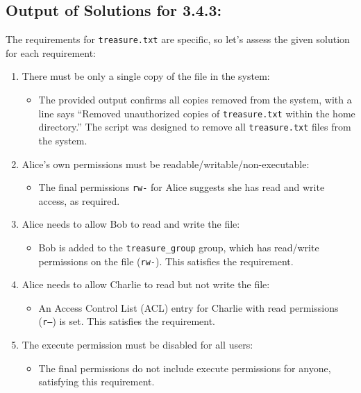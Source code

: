 \documentclass{article}
\begin{document}
\subsection*{Output of Solutions for 3.4.3:}


The requirements for \texttt{treasure.txt} are specific, so let's assess the given solution for each requirement:

\begin{enumerate}
    \item There must be only a single copy of the file in the system:
    \begin{itemize}
        \item The provided output confirms all copies removed from the system, with a line says ``Removed unauthorized copies of \texttt{treasure.txt} within the home directory.'' The script was designed to remove all \texttt{treasure.txt} files from the system. 
    \end{itemize}
    
    \item Alice's own permissions must be readable/writable/non-executable:
    \begin{itemize}
        \item The final permissions \texttt{rw-} for Alice suggests she has read and write access, as required.
    \end{itemize}
    
    \item Alice needs to allow Bob to read and write the file:
    \begin{itemize}
        \item Bob is added to the \texttt{treasure\_group} group, which has read/write permissions on the file (\texttt{rw-}). This satisfies the requirement.
    \end{itemize}
    
    \item Alice needs to allow Charlie to read but not write the file:
    \begin{itemize}
        \item An Access Control List (ACL) entry for Charlie with read permissions (\texttt{r--}) is set. This satisfies the requirement.
    \end{itemize}
    
    \item The execute permission must be disabled for all users:
    \begin{itemize}
        \item The final permissions do not include execute permissions for anyone, satisfying this requirement.
    \end{itemize}
    

\end{enumerate}
\end{document}
